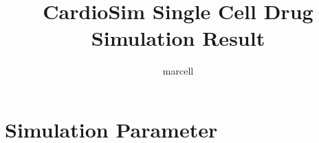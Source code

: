 \documentclass[11pt]{article}
\title{CardioSim Single Cell Drug Simulation Result}
\author{marcell}
\begin{document}
\maketitle
\section*{Simulation Parameter}
\end{document}
